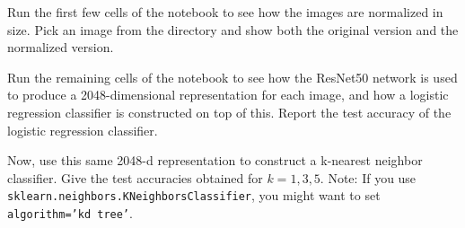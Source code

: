 \documentclass{article}
\begin{document}
\begin{probset}
\begin{progprob}
\begin{subprobset}
\begin{subprob}
        Run the first few cells of the notebook to see how the images are normalized in size. Pick an image from the directory and show both the original version and the normalized version.

        \begin{soln}

        \end{soln}
    \end{subprob}

    \begin{subprob}
        Run the remaining cells of the notebook to see how the ResNet50 network is used to produce a 2048-dimensional representation for each image, and how a logistic regression classifier is constructed on top of this. Report the test accuracy of the logistic regression classifier.

        \begin{soln}

        \end{soln}
    \end{subprob}

    \begin{subprob}
        Now, use this same 2048-d representation to construct a k-nearest neighbor classifier. Give the test accuracies obtained for $k = 1, 3, 5$. Note: If you use \texttt{sklearn.neighbors.KNeighborsClassifier}, you might want to set \texttt{algorithm='kd tree'}.

        \begin{soln}

        \end{soln}
    \end{subprob}
    \end{subprobset}
\end{progprob}
\end{probset}
\end{document}
